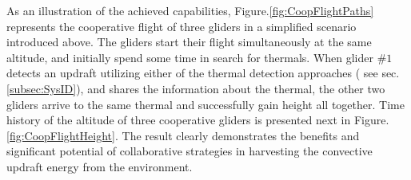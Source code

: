 \documentclass{ifacconf}
\begin{document}
%
%

As an illustration of the achieved capabilities,
Figure.\ref{fig:CoopFlightPaths} represents the cooperative flight of three
gliders in a simplified scenario introduced above. The gliders start their
flight simultaneously at the same altitude, and initially spend some time in
search for thermals. When glider $\#1$ detects an updraft utilizing either of
the thermal detection approaches ( see sec.\ref{subsec:SysID}), and shares
the information about the thermal, the other two gliders arrive to the same
thermal and successfully gain height all together. Time history of the
altitude of three cooperative gliders is presented next in
Figure.\ref{fig:CoopFlightHeight}. The result clearly demonstrates the
benefits and significant potential of collaborative strategies in harvesting
the convective updraft energy from the environment.
\end{document}
